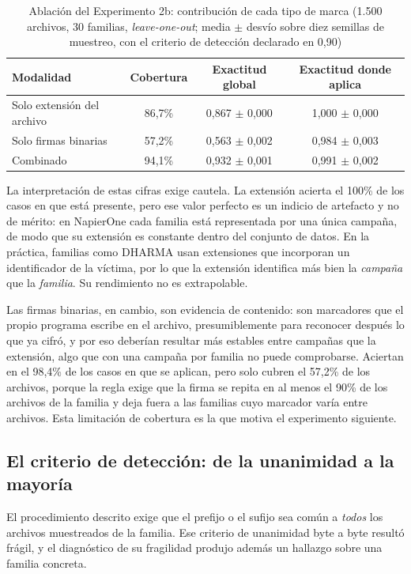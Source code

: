 \begin{table}[ht]
\centering
\caption{Ablación del Experimento 2b: contribución de cada tipo de marca (1.500 archivos, 30 familias, \textit{leave-one-out}; media $\pm$ desvío sobre diez semillas de muestreo, con el criterio de detección declarado en 0,90)}
\label{tab:exp2b}
\begin{tabular}{|l|c|c|c|}
\hline
\textbf{Modalidad} & \textbf{Cobertura} & \textbf{Exactitud global} & \textbf{Exactitud donde aplica} \\
\hline
Solo extensión del archivo & 86,7\% & 0,867 $\pm$ 0,000 & 1,000 $\pm$ 0,000 \\
Solo firmas binarias & 57,2\% & 0,563 $\pm$ 0,002 & 0,984 $\pm$ 0,003 \\
Combinado & 94,1\% & 0,932 $\pm$ 0,001 & 0,991 $\pm$ 0,002 \\
\hline
\end{tabular}
\end{table}

La interpretación de estas cifras exige cautela. La extensión acierta el 100\% de los casos en que está presente, pero ese valor perfecto es un indicio de artefacto y no de mérito: en NapierOne cada familia está representada por una única campaña, de modo que su extensión es constante dentro del conjunto de datos. En la práctica, familias como DHARMA usan extensiones que incorporan un identificador de la víctima, por lo que la extensión identifica más bien la \textit{campaña} que la \textit{familia}. Su rendimiento no es extrapolable.

Las firmas binarias, en cambio, son evidencia de contenido: son marcadores que el propio programa escribe en el archivo, presumiblemente para reconocer después lo que ya cifró, y por eso deberían resultar más estables entre campañas que la extensión, algo que con una campaña por familia no puede comprobarse. Aciertan en el 98,4\% de los casos en que se aplican, pero solo cubren el 57,2\% de los archivos, porque la regla exige que la firma se repita en al menos el 90\% de los archivos de la familia y deja fuera a las familias cuyo marcador varía entre archivos. Esta limitación de cobertura es la que motiva el experimento siguiente.

\subsection{El criterio de detección: de la unanimidad a la mayoría}
\label{subsec:exp2b_criterio}

El procedimiento descrito exige que el prefijo o el sufijo sea común a \textit{todos} los archivos muestreados de la familia. Ese criterio de unanimidad byte a byte resultó frágil, y el diagnóstico de su fragilidad produjo además un hallazgo sobre una familia concreta.

